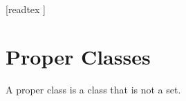 \documentclass[10pt]{article}
\begin{document}
  \begin{imports}
    \begin{forthel}
      [readtex ]
    \end{forthel}
  \end{imports}


  \section*{Proper Classes}

  \begin{forthel}
    \begin{definition}[id=FOUNDATIONS_10_8452102365965847,printid]
      A proper class is a class that is not a set.
    \end{definition}
  \end{forthel}
\end{document}
